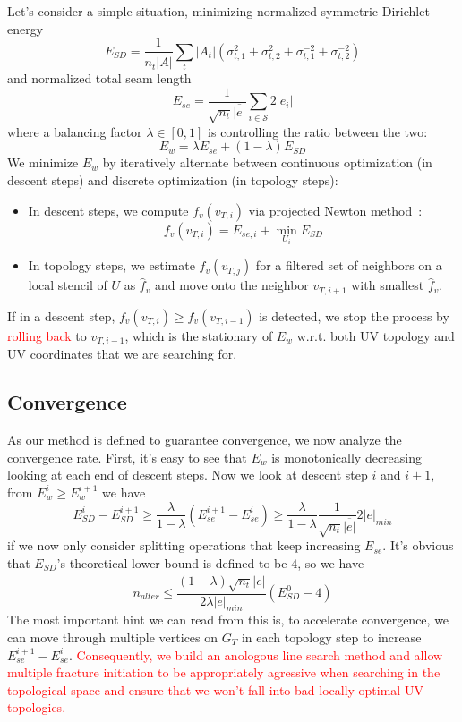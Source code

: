 Let's consider a simple situation, minimizing normalized symmetric Dirichlet energy~\cite{Smith2015Bijective}
\[ E_{SD} = \frac{1}{n_t \overline{|A|}} \sum_t |A_t|(\sigma_{t,1}^2 + \sigma_{t,2}^2 + \sigma_{t,1}^{-2} + \sigma_{t,2}^{-2}) \]
and normalized total seam length
\[ E_{se} = \frac{1}{\sqrt{n_t}\overline{|e|}} \sum_{i \in \mathcal{S}} 2|e_i| \]
where a balancing factor $\lambda \in [0, 1]$ is controlling the ratio between the two: 
\[ E_w = \lambda E_{se} + (1 - \lambda) E_{SD} \]
We minimize $E_w$ by iteratively alternate between continuous optimization (in descent steps) and discrete optimization (in topology steps):
\begin{itemize}
\item In descent steps, we compute $f_v(v_{T,i})$ via projected Newton method~\cite{Teran2005Robust}:
\[ f_v(v_{T,i}) = E_{se,i} + \min_{U_i} E_{SD} \]
\item In topology steps, we estimate $f_v(v_{T,j})$ for a filtered set of neighbors on a local stencil of $U$ as $\hat{f}_v$ and move onto the neighbor $v_{T,i+1}$ with smallest $\hat{f}_v$.
\end{itemize}
If in a descent step, $f_v(v_{T,i}) \geq f_v(v_{T,i-1})$ is detected, we stop the process by \textcolor{red}{rolling back} to $v_{T,i-1}$, which is the stationary of $E_w$ w.r.t. both UV topology and UV coordinates that we are searching for.

\subsection{Convergence}

As our method is defined to guarantee convergence, we now analyze the convergence rate. First, it's easy to see that $E_w$ is monotonically decreasing looking at each end of descent steps. Now we look at descent step $i$ and $i+1$, from $E^i_w \geq E^{i+1}_w$ we have
\[ E^i_{SD} - E^{i+1}_{SD} \geq \frac{\lambda}{1-\lambda} (E^{i+1}_{se} - E^i_{se}) \geq \frac{\lambda}{1-\lambda} \frac{1}{\sqrt{n_t}\overline{|e|}} 2|e|_{min} \]
if we now only consider splitting operations that keep increasing $E_{se}$. It's obvious that $E_{SD}$'s theoretical lower bound is defined to be $4$, so we have
\[ n_{alter} \leq \frac{(1-\lambda)\sqrt{n_t}\overline{|e|}}{2\lambda|e|_{min}} (E^0_{SD} - 4) \]
The most important hint we can read from this is, to accelerate convergence, we can move through multiple vertices on $G_T$ in each topology step to increase $E^{i+1}_{se} - E^i_{se}$. \textcolor{red}{Consequently, we build an anologous line search method and allow multiple fracture initiation to be appropriately agressive when searching in the topological space and ensure that we won't fall into bad locally optimal UV topologies.}

